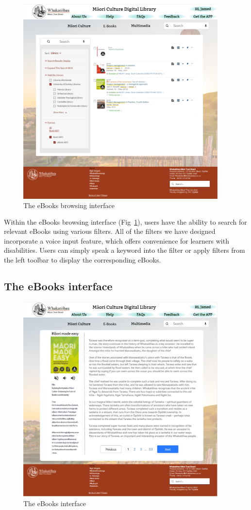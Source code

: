 \begin{figure}[htbp]
  \centerline{\includegraphics[width=300pt]{images/3-2-1.png}}
  \caption{The eBooks browsing interface}
  \label{fig3.2.1}
\end{figure}

Within the eBooks browsing interface (Fig~\ref{fig3.2.1}), users have the ability to search for relevant eBooks using various filters. All of the filters we have designed incorporate a voice input feature, which offers convenience for learners with disabilities. Users can simply speak a keyword into the filter or apply filters from the left toolbar to display the corresponding eBooks.

\subsection{The eBooks interface}

\begin{figure}[htbp]
  \centerline{\includegraphics[width=300pt]{images/3-2-2.png}}
  \caption{The eBooks interface}
  \label{fig3.2.2}
\end{figure}

